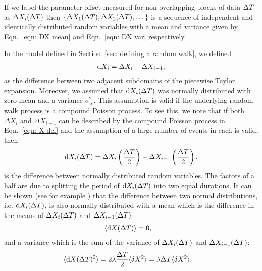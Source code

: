 \documentclass[../full_thesis/full_thesis.tex]{subfiles}
\begin{document}
If we label the parameter offset measured for non-overlapping blocks of data
$\Delta T$ as  $\Delta
X_{i}(\Delta T)$ then $\{\Delta X_{1}(\Delta T), \Delta X_{2}(\Delta T), \dots\}$ is a
sequence of independent and identically distributed random variables with a mean
and variance given by Eqn.~\eqref{eqn: DX mean} and Eqn.~\eqref{eqn: DX var}
respectively.

In the model defined in Section~\ref{sec: defining a random walk}, we defined
\begin{align}
\mathrm{d} X_{i} = \Delta X_{i} - \Delta X_{i-1},
\end{align}
as the difference between two adjacent subdomains of the piecewise Taylor
expansion. Moreover, we assumed that $\mathrm{d} X_i(\Delta T)$ was normally distributed
with zero mean and a variance $\sigma_{X}^{2}$.  This assumption is valid if
the underlying random walk process is a compound Poisson process. To see this,
we note that if both $\Delta X_{i}$ and $\Delta X_{i-1}$ can be described by
the compound Poisson process in Eqn.~\eqref{eqn: X def} and the assumption of
a large number of events in each is valid, then
\begin{align}
\mathrm{d} X_{i}(\Delta T) =  \Delta X_{i}\left(\frac{\Delta T}{2}\right)
                - \Delta X_{i-1}\left(\frac{\Delta T}{2}\right),
\end{align}
is the difference between normally distributed random variables. The factors of
a half are due to splitting the period of $\mathrm{d} X_i(\Delta T)$ into two equal
durations. It can be shown (see for example \citet{wolframdifference})
that the difference between two normal distributions, i.e. $\mathrm{d} X_i (\Delta T)$, is
also normally distributed with a mean which is the difference in the means of
$\Delta X_{i}(\Delta T)$ and $\Delta X_{i-1}(\Delta T)$:
\begin{align}
\langle \mathrm{d} X(\Delta T) \rangle & = 0,
\label{eqn: Poisson expectation}
\end{align}
and a variance which is the sum of the variance of
$\Delta X_{i}(\Delta T)$ and $\Delta X_{i-1}(\Delta T)$:
\begin{align}
\langle \mathrm{d} X(\Delta T)^{2} \rangle &  =
2 \lambda \frac{\Delta T}{2} \langle \delta X^{2}\rangle
= \lambda \Delta T \langle \delta X^{2}\rangle.
\label{eqn: Poisson variance}
\end{align}
\end{document}

